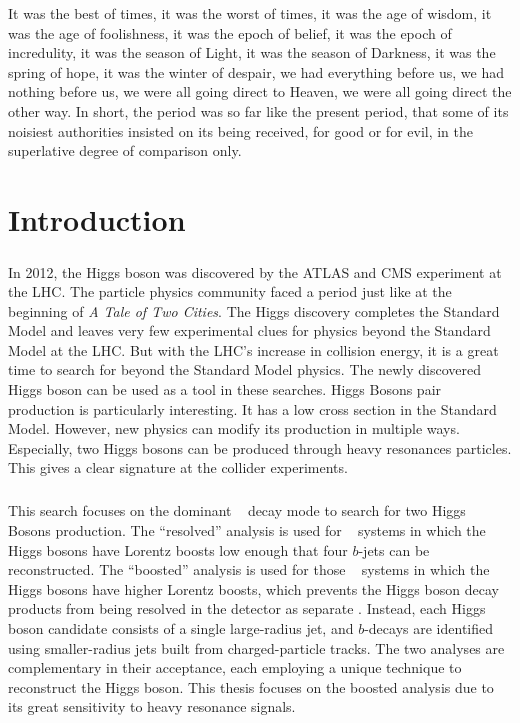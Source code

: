 \begin{savequote}[75mm]
It was the best of times, it was the worst of times, it was the age of wisdom, it was the age of foolishness, it was the epoch of belief, it was the epoch of incredulity, it was the season of Light, it was the season of Darkness, it was the spring of hope, it was the winter of despair, we had everything before us, we had nothing before us, we were all going direct to Heaven, we were all going direct the other way. In short, the period was so far like the present period, that some of its noisiest authorities insisted on its being received, for good or for evil, in the superlative degree of comparison only.
\end{savequote}

\chapter{Introduction}
\label{introduction}

\paragraph{}
In 2012, the Higgs boson was discovered by the ATLAS and CMS experiment at the LHC. 
The particle physics community faced a period just like at the beginning of \textit{A Tale of Two Cities}. 
The Higgs discovery completes the Standard Model and leaves very few experimental clues for physics beyond the Standard Model at the LHC.
But with the LHC's increase in collision energy, it is a great time to search for beyond the Standard Model physics.
The newly discovered Higgs boson can be used as a tool in these searches.
Higgs Bosons pair production is particularly interesting.
It has a low cross section in the Standard Model.
However, new physics can modify its production in multiple ways. 
Especially, two Higgs bosons can be produced through heavy resonances particles.
This gives a clear signature at the collider experiments.

\paragraph{}
This search focuses on the dominant \hbb~ decay mode to search for two Higgs Bosons production. 
The ``resolved'' analysis is used for \hh~ systems in which the Higgs bosons have Lorentz boosts low enough that four $b$-jets can be reconstructed. 
The ``boosted'' analysis is used for those \hh~ systems in which the Higgs bosons have higher Lorentz boosts, which prevents the Higgs boson decay products from being resolved in the detector as separate \bjets. 
Instead, each Higgs boson candidate consists of a single large-radius jet, and $b$-decays are identified using smaller-radius jets built from charged-particle tracks.
The two analyses are complementary in their acceptance, each employing a unique technique to reconstruct the Higgs boson.
This thesis focuses on the boosted analysis due to its great sensitivity to heavy resonance signals.

